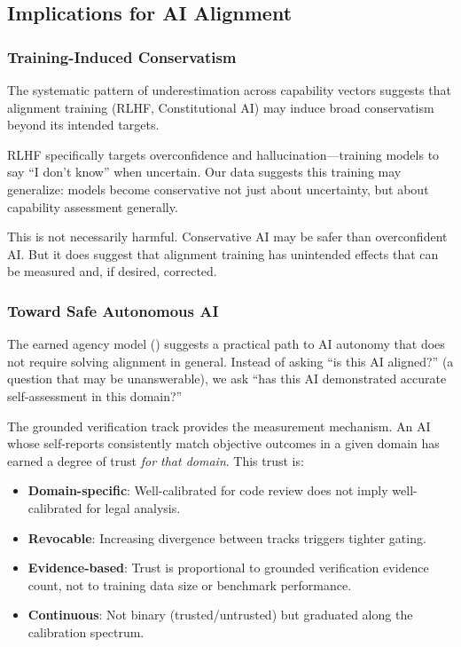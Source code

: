 \subsection{Implications for AI Alignment}

\subsubsection{Training-Induced Conservatism}

The systematic pattern of underestimation across capability vectors suggests that alignment training (RLHF, Constitutional AI) may induce broad conservatism beyond its intended targets.

RLHF specifically targets overconfidence and hallucination---training models to say ``I don't know'' when uncertain. Our data suggests this training may generalize: models become conservative not just about uncertainty, but about capability assessment generally.

This is not necessarily harmful. Conservative AI may be safer than overconfident AI. But it does suggest that alignment training has unintended effects that can be measured and, if desired, corrected.

\subsubsection{Toward Safe Autonomous AI}

The earned agency model () suggests a practical path to AI autonomy that does not require solving alignment in general. Instead of asking ``is this AI aligned?'' (a question that may be unanswerable), we ask ``has this AI demonstrated accurate self-assessment in this domain?''

The grounded verification track provides the measurement mechanism. An AI whose self-reports consistently match objective outcomes in a given domain has earned a degree of trust \emph{for that domain}. This trust is:

\begin{itemize}
    \item \textbf{Domain-specific}: Well-calibrated for code review does not imply well-calibrated for legal analysis.
    \item \textbf{Revocable}: Increasing divergence between tracks triggers tighter gating.
    \item \textbf{Evidence-based}: Trust is proportional to grounded verification evidence count, not to training data size or benchmark performance.
    \item \textbf{Continuous}: Not binary (trusted/untrusted) but graduated along the calibration spectrum.
\end{itemize}

